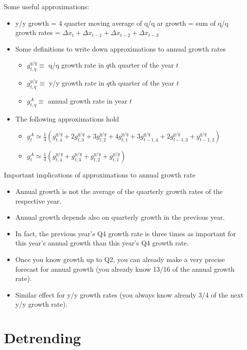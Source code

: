 \documentclass{article}
\begin{document}
Some useful approximations:

\begin{itemize}
    \item y/y growth = 4 quarter moving average of q/q ar growth = sum of q/q growth rates = $\Delta x_t+\Delta x_{t-1}+\Delta x_{t-2}+\Delta x_{t-3}$
    \item Some definitions to write down approximations to annual growth rates
    \begin{itemize}
        \item $g_{t,q}^{q/q}\equiv$ q/q growth rate in $q$th quarter of the year $t$
        \item $g_{t,q}^{y/y}\equiv$ y/y growth rate in $q$th quarter of the year $t$
        \item $g_{t,q}^{A}\equiv$ annual growth rate in year $t$
    \end{itemize}
    \item The following approximations hold
    \begin{itemize}
        \item $g_t^A\simeq\frac{1}{4}(g_{t,4}^{q/q}+2g_{t,3}^{q/q}+3g_{t,2}^{q/q}+4g_{t,1}^{q/q}+3g_{t-1,4}^{q/q}+2g_{t-1,3}^{q/q}+g_{t-1,2}^{q/q})$
        \item $g_t^A\simeq\frac{1}{4}(g_{t,4}^{y/y}+g_{t,3}^{y/y}+g_{t,2}^{y/y}+g_{t,1}^{y/y})$
    \end{itemize}
\end{itemize}

Important implications of approximations to annual growth rate

\begin{itemize}
    \item Annual growth is not the average of the quarterly growth rates of the respective year.
    \item Annual growth depends also on quarterly growth in the previous year.
    \item In fact, the previous year's Q4 growth rate is three times as important for this year's annual growth than this year's Q4 growth rate.
    \item Once you know growth up to Q2, you can already make a very precise forecast for annual growth (you already know 13/16 of the annual growth rate).
    \item Similar effect for y/y growth rates (you always know already 3/4 of the next y/y growth rate).
\end{itemize}

\section{Detrending}
\end{document}
